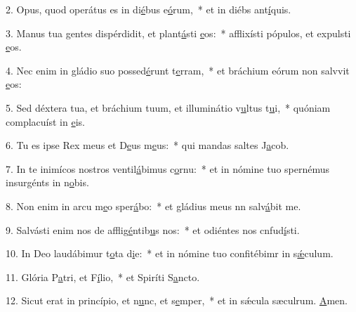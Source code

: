 2. Opus, quod operátus es in di\uline{é}bus e\uline{ó}rum,~* et in diébs ant\uline{í}quis.\par 
3. Manus tua gentes dispérdidit, et plant\uline{á}sti \uline{e}os:~* afflixísti pópulos, et expulsti \uline{e}os.\par 
4. Nec enim in gládio suo possed\uline{é}runt t\uline{e}rram,~* et bráchium eórum non salvvit \uline{e}os:\par 
5. Sed déxtera tua, et bráchium tuum, et illuminátio v\uline{u}ltus t\uline{u}i,~* quóniam complacuíst in \uline{e}is.\par 
6. Tu es ipse Rex meus et D\uline{e}us m\uline{e}us:~* qui mandas saltes J\uline{a}cob.\par 
7. In te inimícos nostros ventil\uline{á}bimus c\uline{o}rnu:~* et in nómine tuo spernémus insurgénts in n\uline{o}bis.\par 
8. Non enim in arcu m\uline{e}o sper\uline{á}bo:~* et gládius meus nn salv\uline{á}bit me.\par 
9. Salvásti enim nos de afflig\uline{é}ntib\uline{u}s nos:~* et odiéntes nos cnfud\uline{í}sti.\par 
10. In Deo laudábimur t\uline{o}ta d\uline{i}e:~* et in nómine tuo confitébimr in s\uline{ǽ}culum.\par 
11. Glória P\uline{a}tri, et F\uline{í}lio,~* et Spiríti S\uline{a}ncto.\par 
12. Sicut erat in princípio, et n\uline{u}nc, et s\uline{e}mper,~* et in sǽcula sæculrum. \uline{A}men.\par 
